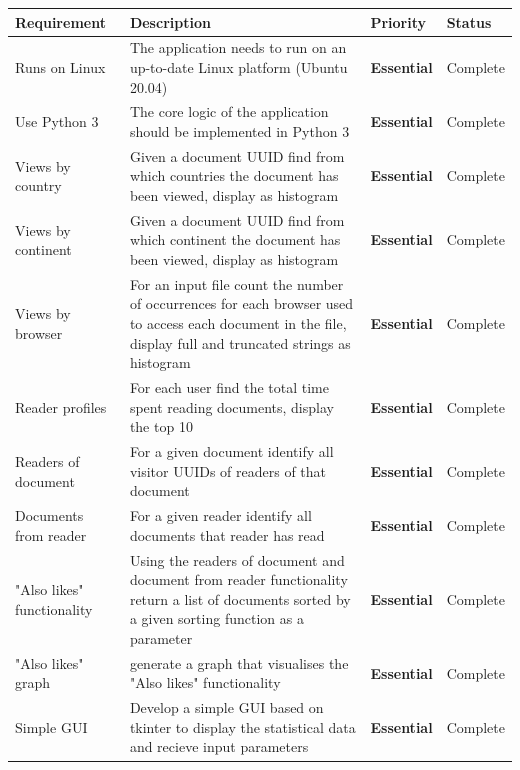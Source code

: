 \documentclass[11pt]{article}
\begin{document}
\begin{center}
    \begin{longtable}{|p{3cm}|p{7cm}|l|p{2cm}|}
        \hline
        \textbf{Requirement} & \textbf{Description} & \textbf{Priority} & \textbf{Status}\\
        \hline \endhead
        Runs on Linux & The application needs to run on an up-to-date Linux platform (Ubuntu 20.04) & \textbf{Essential} & Complete \\
        \hline
        Use Python 3 & The core logic of the application should be implemented in Python 3 & \textbf{Essential} & Complete\\
        \hline
        Views by country & Given a document UUID find from which countries the document has been viewed, display as histogram & \textbf{Essential} & Complete\\
        \hline
        Views by continent & Given a document UUID find from which continent the document has been viewed, display as histogram & \textbf{Essential} & Complete\\ 
        \hline
        Views by browser & For an input file count the number of occurrences for each browser used to access each document in the file, display full and truncated strings as histogram & \textbf{Essential} & Complete \\
        \hline
        Reader profiles & For each user find the total time spent reading documents, display the top 10 & \textbf{Essential} & Complete \\
        \hline
        Readers of document & For a given document identify all visitor UUIDs of readers of that document & \textbf{Essential} & Complete \\
        \hline
        Documents from reader & For a given reader identify all documents that reader has read & \textbf{Essential} & Complete \\
        \hline
        "Also likes" functionality & Using the readers of document and document from reader functionality return a list of documents sorted by a given sorting function as a parameter & \textbf{Essential} & Complete \\ 
        \hline
        "Also likes" graph & generate a graph that visualises the "Also likes" functionality & \textbf{Essential} & Complete \\
        \hline
        Simple GUI & Develop a simple GUI based on tkinter to display the statistical data and recieve input parameters & \textbf{Essential} & Complete \\

\end{longtable}
\end{center}
\end{document}
